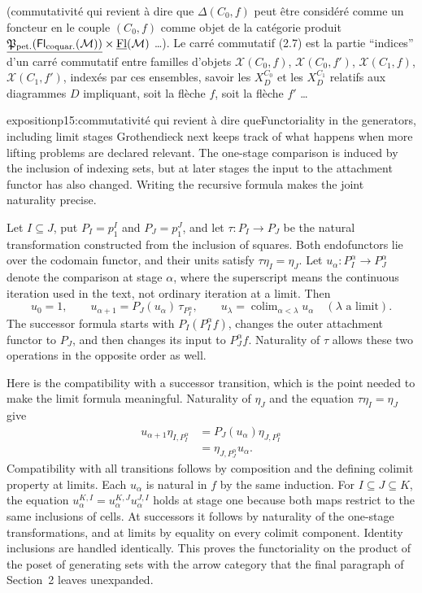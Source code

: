 (commutativité qui revient à dire que $\Delta(C_0,f)$ peut être considéré comme un foncteur en le couple $(C_0,f)$ comme objet de la catégorie produit $\underline{\mathfrak{P}_{\text{pet.}}(\mathsf{Fl}_{\text{coquar.}}(\mathcal{M}))}\times\underline{\mathrm{Fl}}(\mathcal{M})$ \ldots). Le carré commutatif (2.7) est la partie ``indices'' d'un carré commutatif entre familles d'objets $\mathscr{X}(C_0,f)$, $\mathscr{X}(C_0,f')$, $\mathscr{X}(C_1,f)$, $\mathscr{X}(C_1,f')$,
indexés par ces ensembles, savoir les $X_D^{C_0}$ et les $X_D^{C_1}$ relatifs aux diagrammes $D$ impliquant, soit la flèche $f$, soit la flèche $f'$ \ldots

\begin{dcomment}{exposition}{p15:commutativité qui revient à dire que}{Functoriality in the generators, including limit stages}
Grothendieck next keeps track of what happens when more lifting problems are declared relevant. The one-stage comparison is induced by the inclusion of indexing sets, but at later stages the input to the attachment functor has also changed. Writing the recursive formula makes the joint naturality precise.

Let $I\subseteq J$, put $P_I=p_1^I$ and $P_J=p_1^J$, and let $\tau:P_I\to P_J$ be the natural transformation constructed from the inclusion of squares. Both endofunctors lie over the codomain functor, and their units satisfy $\tau\eta_I=\eta_J$. Let $u_\alpha:P_I^\alpha\to P_J^\alpha$ denote the comparison at stage $\alpha$, where the superscript means the continuous iteration used in the text, not ordinary iteration at a limit. Then
\[
 u_0=1,\qquad
 u_{\alpha+1}=P_J(u_\alpha)\,\tau_{P_I^\alpha},\qquad
 u_\lambda=\mathop{\mathrm{colim}}_{\alpha<\lambda}u_\alpha
 \quad(\lambda\text{ a limit}).
\]
The successor formula starts with $P_I(P_I^\alpha f)$, changes the outer attachment functor to $P_J$, and then changes its input to $P_J^\alpha f$. Naturality of $\tau$ allows these two operations in the opposite order as well.

Here is the compatibility with a successor transition, which is the point needed to make the limit formula meaningful. Naturality of $\eta_J$ and the equation $\tau\eta_I=\eta_J$ give
\[
 \begin{split}
 u_{\alpha+1}\eta_{I,P_I^\alpha}
 &=P_J(u_\alpha)\eta_{J,P_I^\alpha}\\
 &=\eta_{J,P_J^\alpha}u_\alpha.
 \end{split}
\]
Compatibility with all transitions follows by composition and the defining colimit property at limits. Each $u_\alpha$ is natural in $f$ by the same induction. For $I\subseteq J\subseteq K$, the equation $u_\alpha^{K,I}=u_\alpha^{K,J}u_\alpha^{J,I}$ holds at stage one because both maps restrict to the same inclusions of cells. At successors it follows by naturality of the one-stage transformations, and at limits by equality on every colimit component. Identity inclusions are handled identically. This proves the functoriality on the product of the poset of generating sets with the arrow category that the final paragraph of Section~2 leaves unexpanded.


\end{dcomment}
